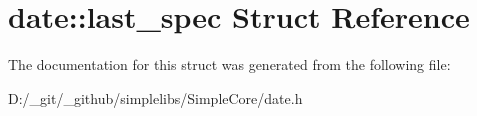 \hypertarget{structdate_1_1last__spec}{}\section{date\+::last\+\_\+spec Struct Reference}
\label{structdate_1_1last__spec}


The documentation for this struct was generated from the following file\+:\begin{DoxyCompactItemize}
\item 
D\+:/\+\_\+git/\+\_\+github/simplelibs/\+Simple\+Core/date.\+h\end{DoxyCompactItemize}
